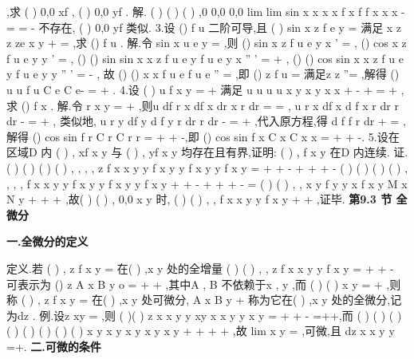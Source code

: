 ,求
(
)
0,0
xf
,
(
)
0,0
yf
. 
解.
(
)
(
)
(
)
,0
0,0
0,0
lim
lim
sin
x
x
x
x
f x
f
f
x
x
x
\to 
\to 
-
=
=
-
不存在,
(
)
0,0
yf
类似. 
3.设
()
f u 二阶可导,且
(
)
sin
x
z
f e
y
=
满足
x
z
z
ze
x
y
\partial 
\partial 
+
=
\partial 
\partial 
,求
()
f u . 
解.令
sin
x
u
e
y
=
,则
()
sin
x
z
f
u e
y
x
\partial 
'
=
\partial 
,
()
cos
x
z
f
u e
y
y
\partial 
'
=
\partial 
, 
()
()
sin
sin
x
x
z
f
u e
y
f
u e
y
x
\partial 
''
'
=
+
\partial 
,
()
()
cos
sin
x
x
z
f
u e
y
f
u e
y
y
\partial 
''
'
=
-
\partial 
, 
故
()
()
x
x
f
u e
f u e
''
=
,即
()
z
f u
=
满足z
z
''=
,解得
()
u
u
f u
C e
C e-
=
+
. 
4.设
(
)
u
f
x
y
=
+
满足
u
u
u
u
x
y
x
y
x
x
\partial 
\partial 
\partial 
+
-
\cdots 
+
=
+
\partial 
\partial 
\partial 
,求
()
f x . 
解.令
r
x
y
=
+
,则u
df
r
x df
x
dr
x
r dr
\partial 
\partial 
=
=
\partial 
\partial 
,
u
r
x df
x d f
x
r
dr
r
dr
\partial 
-
=
+
\partial 
, 
类似地,
u
r
y df
y d f
y
r
dr
r
dr
\partial 
-
=
+
\partial 
,代入原方程,得
d f
f
r
dr
+
=
,解得 
()
cos
sin
f r
C
r
C
r
r
=
+
+
-,即
()
cos
sin
f x
C
x
C
x
x
=
+
+
-. 
5.设在区域D 内
(
)
,
xf
x y 与
(
)
,
yf
x y 均存在且有界,证明:
(
)
,
f x y 在D 内连续. 
证.
(
)
(
)
(
)
(
)
,
,
,
,
z
f x
x y
y
f x y
y
f x y
y
f x y
\Delta 
=
+\Delta 
+\Delta 
-
+\Delta 
+
+\Delta 
-
\le  
(
)
(
)
(
)
(
)
,
,
,
,
f x
x y
y
f x y
y
f x y
y
f x y
+\Delta 
+\Delta 
-
+\Delta 
+
+\Delta 
-
= 
(
)
(
)
,
,
x
y
f
y
y
x
f
x
y
M
x
N
y
\psi 
\eta 
+\Delta 
\Delta +
\Delta 
\le 
\Delta +
\Delta ,故(
)
(
)
,
0,0
x
y
\Delta 
\Delta 
\to 
时, 
(
)
(
)
,
,
f x
x y
y
f x y
+\Delta 
+\Delta 
\to 
,证毕. 
\vspace{6pt}
{\large \bfseries \textcolor{lyred}{第9.3 节 全微分}}

\vspace{4pt}
{\bfseries \textcolor{lyred}{一.全微分的定义}}

\textcolor{lyred}{定义}.若
(
)
,
z
f x y
=
在(
)
,x y 处的\textcolor{lyred}{全增量}
(
)
(
)
,
,
z
f x
x y
y
f x y
\Delta =
+\Delta 
+\Delta 
-
可表示为 
()
z
A
x
B
y
o \rho 
\Delta =
\cdots \Delta +
\cdots \Delta +
,其中A , B 不依赖于x
\Delta , y
\Delta ,而
(
)
(
)
x
y
\rho =
\Delta 
+\Delta 
,则 
称
(
)
,
z
f x y
=
在(
)
,x y 处\textcolor{lyred}{可微分}, A x
B y
\Delta +
\Delta 称为它在(
)
,x y 处的\textcolor{lyred}{全微分},记为dz . 
\textcolor{lyred}{例}.设z
xy
=
,则
(
)(
)
z
x
x
y
y
xy
x x
y y
x y
\Delta =
+\Delta 
+\Delta 
-
=\Delta +\Delta +\Delta \Delta ,而 
(
)
(
)
(
)
(
)
(
)
(
)
(
)
(
)
x y
x
y
x
y
x
y
x
y
\Delta \Delta 
\Delta 
+\Delta 
\le 
\cdots 
\le 
\Delta 
+\Delta 
\Delta 
+\Delta 
\Delta 
+\Delta 
,故
lim
x y
\rho 
\rho 
\to 
\Delta \Delta =
,可微,且 
dz
x x
y y
=\Delta +\Delta . 
\vspace{4pt}
{\bfseries \textcolor{lyred}{二.可微的条件}}


